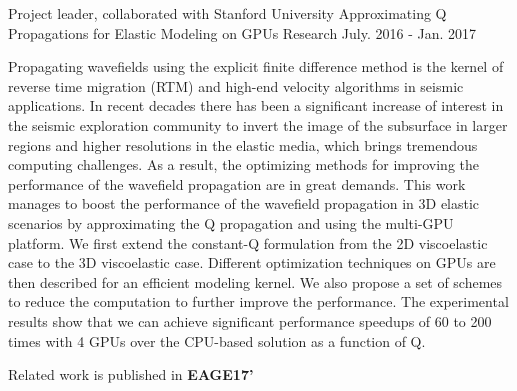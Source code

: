 \documentclass[11pt, a4paper]{awesome-cv}
\begin{document}
\begin{cventries}
  \cventry
    {Project leader, collaborated with Stanford University} %
    {Approximating Q Propagations for Elastic Modeling on GPUs} %
    {Research} %
    {July. 2016 - Jan. 2017} %
    {
      \begin{cvitems} %
        \item {Propagating wavefields using the explicit finite difference method is the kernel of reverse time migration (RTM) and high-end velocity algorithms in seismic applications. In recent decades there has been a significant increase of interest in the seismic exploration community to invert the image of the subsurface in larger regions and higher resolutions in the elastic media, which brings tremendous computing challenges. As a result, the optimizing methods for improving the performance of the wavefield propagation are in great demands. This work manages to boost the performance of the wavefield propagation in 3D elastic scenarios by approximating the Q propagation and using the multi-GPU platform. We first extend the constant-Q formulation from the 2D viscoelastic case to the 3D viscoelastic case. Different optimization techniques on GPUs are then described for an efficient modeling kernel. We also propose a set of schemes to reduce the computation to further improve the performance. The experimental results show that we can achieve significant performance speedups of 60 to 200 times with 4 GPUs over the CPU-based solution as a function of Q.​}
       \item {Related work is published in \textbf{EAGE17'}}
      \end{cvitems}
    }
  

\end{cventries}
\end{document}

